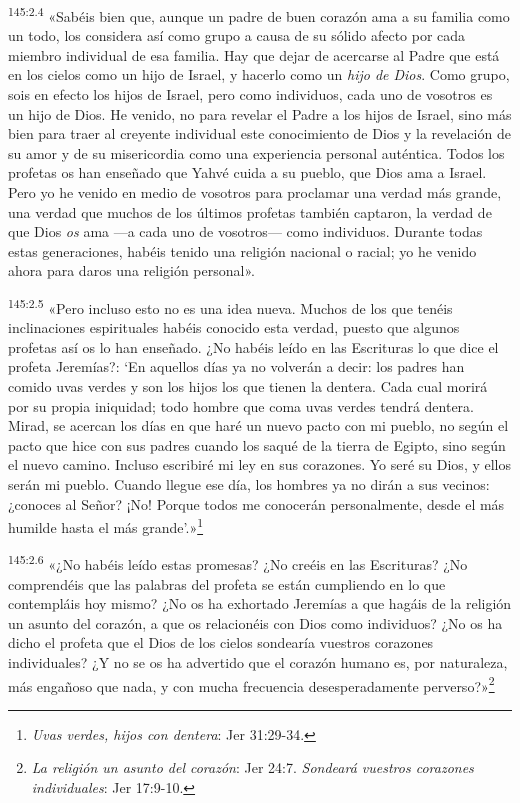 \par
\textsuperscript{145:2.4} «Sabéis bien que, aunque un padre de buen corazón ama a su familia como un todo, los considera así como grupo a causa de su sólido afecto por cada miembro individual de esa familia. Hay que dejar de acercarse al Padre que está en los cielos como un hijo de Israel, y hacerlo como un \textit{hijo de Dios}. Como grupo, sois en efecto los hijos de Israel, pero como individuos, cada uno de vosotros es un hijo de Dios. He venido, no para revelar el Padre a los hijos de Israel, sino más bien para traer al creyente individual este conocimiento de Dios y la revelación de su amor y de su misericordia como una experiencia personal auténtica. Todos los profetas os han enseñado que Yahvé cuida a su pueblo, que Dios ama a Israel. Pero yo he venido en medio de vosotros para proclamar una verdad más grande, una verdad que muchos de los últimos profetas también captaron, la verdad de que Dios \textit{os} ama ---a cada uno de vosotros--- como individuos. Durante todas estas generaciones, habéis tenido una religión nacional o racial; yo he venido ahora para daros una religión personal».

\par
\textsuperscript{145:2.5} «Pero incluso esto no es una idea nueva. Muchos de los que tenéis inclinaciones espirituales habéis conocido esta verdad, puesto que algunos profetas así os lo han enseñado. ¿No habéis leído en las Escrituras lo que dice el profeta Jeremías?: `En aquellos días ya no volverán a decir: los padres han comido uvas verdes y son los hijos los que tienen la dentera. Cada cual morirá por su propia iniquidad; todo hombre que coma uvas verdes tendrá dentera. Mirad, se acercan los días en que haré un nuevo pacto con mi pueblo, no según el pacto que hice con sus padres cuando los saqué de la tierra de Egipto, sino según el nuevo camino. Incluso escribiré mi ley en sus corazones. Yo seré su Dios, y ellos serán mi pueblo. Cuando llegue ese día, los hombres ya no dirán a sus vecinos: ¿conoces al Señor? ¡No! Porque todos me conocerán personalmente, desde el más humilde hasta el más grande'.»\footnote{\textit{Uvas verdes, hijos con dentera}: Jer 31:29-34.}

\par
\textsuperscript{145:2.6} «¿No habéis leído estas promesas? ¿No creéis en las Escrituras? ¿No comprendéis que las palabras del profeta se están cumpliendo en lo que contempláis hoy mismo? ¿No os ha exhortado Jeremías a que hagáis de la religión un asunto del corazón, a que os relacionéis con Dios como individuos? ¿No os ha dicho el profeta que el Dios de los cielos sondearía vuestros corazones individuales? ¿Y no se os ha advertido que el corazón humano es, por naturaleza, más engañoso que nada, y con mucha frecuencia desesperadamente perverso?»\footnote{\textit{La religión un asunto del corazón}: Jer 24:7. \textit{Sondeará vuestros corazones individuales}: Jer 17:9-10.}

